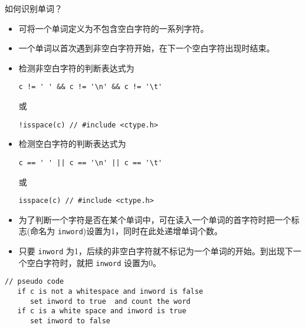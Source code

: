 \begin{frame}[fragile]\ft{\secname}
如何识别单词？ \pause \vspace{.1in}
\begin{itemize}
\item 可将一个单词定义为不包含空白字符的一系列字符。\\[0.15in]
\item 一个单词以首次遇到非空白字符开始，在下一个空白字符出现时结束。
\end{itemize}
\end{frame}

\begin{frame}[fragile]\ft{\secname}
\begin{itemize}
\item 检测非空白字符的判断表达式为
\begin{lstlisting}
c != ' ' && c != '\n' && c != '\t'
\end{lstlisting} 
或
\begin{lstlisting}
!isspace(c) // #include <ctype.h>
\end{lstlisting}\vspace{0.1in}

\item 检测空白字符的判断表达式为
\begin{lstlisting}
c == ' ' || c == '\n' || c == '\t'
\end{lstlisting}
或
\begin{lstlisting}
isspace(c) // #include <ctype.h>
\end{lstlisting}
\end{itemize}
\end{frame}

\begin{frame}[fragile]\ft{\secname}
\begin{itemize}
\item
为了判断一个字符是否在某个单词中，可在读入一个单词的首字符时把一个标志(命名为 \lstinline|inword|)设置为1，同时在此处递增单词个数。\\[.15in] \item
只要 \lstinline|inword| 为1，后续的非空白字符就不标记为一个单词的开始。到出现下一个空白字符时，就把 \lstinline|inword| 设置为0。
\end{itemize}
\begin{lstlisting}
// pseudo code
   if c is not a whitespace and inword is false
      set inword to true  and count the word
   if c is a white space and inword is true
      set inword to false   
\end{lstlisting}

\end{frame}

